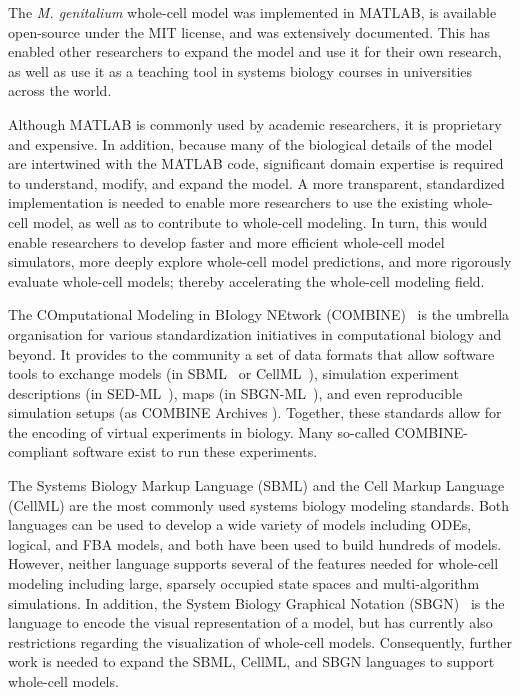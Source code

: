 \documentclass[journal,transmag]{IEEEtran}
\begin{document}
The \textit{M. genitalium} whole-cell model was implemented in MATLAB, is available open-source under the MIT license, and was extensively documented. 
This has enabled other researchers to expand the model and use it for their own research, as well as use it as a teaching tool in systems biology courses in universities across the world. 

Although MATLAB is commonly used by academic researchers, it is proprietary and expensive. In addition, because many of the biological details of the model are intertwined with the MATLAB code, significant domain expertise is required to understand, modify, and expand the model. 
A more transparent, standardized implementation is needed to enable more researchers to use the existing whole-cell model, as well as to contribute to whole-cell modeling. 
In turn, this would enable researchers to develop faster and more efficient whole-cell model simulators, more deeply explore whole-cell model predictions, and more rigorously evaluate whole-cell models; thereby accelerating the whole-cell modeling field.

The COmputational Modeling in BIology NEtwork (COMBINE)~\cite{le2011meeting} is the umbrella organisation for various standardization initiatives in computational biology and beyond.
It provides  to the community a set of data formats that allow software tools to exchange models (in SBML~\cite{hucka2003} or CellML~\cite{hedley_2001b}), simulation experiment descriptions (in SED-ML~\cite{sedml2011}), maps (in SBGN-ML~\cite{IerselVCBBLDSDMFAMMKNS12}), and even reproducible simulation setups (as COMBINE Archives \cite{Bergmann2014combine}).  
Together, these standards allow for the encoding of virtual experiments in biology. 
Many so-called COMBINE-compliant software exist to run these experiments. 

The Systems Biology Markup Language (SBML) and the Cell Markup Language (CellML) are the most commonly used systems biology modeling standards. 
Both languages can be used to develop a wide variety of models including ODEs, logical, and FBA models, and both have been used to build hundreds of models. 
However, neither language supports several of the features needed for whole-cell modeling including large, sparsely occupied state spaces and multi-algorithm simulations. 
In addition, the System Biology Graphical Notation (SBGN)~\cite{LeNovereHMMSS09} is the language to encode the visual representation of a model, but has currently also restrictions regarding the visualization of whole-cell models. 
Consequently, further work is needed to expand the SBML, CellML, and SBGN languages to support whole-cell models.
\end{document}
